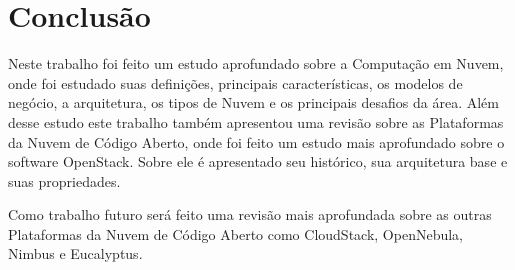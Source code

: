 \chapter{Conclusão}

Neste trabalho foi feito um estudo aprofundado sobre a Computação em Nuvem, onde foi estudado suas definições, principais características, os modelos de negócio, a arquitetura, os tipos de Nuvem e os principais desafios da área. Além desse estudo este trabalho também apresentou uma revisão sobre as Plataformas da Nuvem de Código Aberto, onde foi feito um estudo mais aprofundado sobre o software OpenStack. Sobre ele é apresentado seu histórico, sua arquitetura base e suas propriedades.

Como trabalho futuro será feito uma revisão mais aprofundada sobre as outras Plataformas da Nuvem de Código Aberto como CloudStack, OpenNebula, Nimbus e Eucalyptus. 
